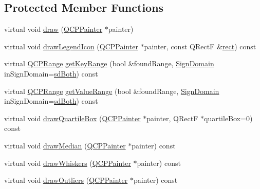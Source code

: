 \subsection*{Protected Member Functions}
\begin{DoxyCompactItemize}
\item 
virtual void \hyperlink{class_q_c_p_statistical_box_a753b62761217dd6b92f8a29e286a1317}{draw} (\hyperlink{class_q_c_p_painter}{Q\+C\+P\+Painter} $\ast$painter)
\item 
virtual void \hyperlink{class_q_c_p_statistical_box_a51764ed423fa02d3ef63f6848851ec33}{draw\+Legend\+Icon} (\hyperlink{class_q_c_p_painter}{Q\+C\+P\+Painter} $\ast$painter, const Q\+Rect\+F \&\hyperlink{_gen_blob_8m_aea8f6815d9a63491fc422c5572c6b3c3}{rect}) const 
\item 
virtual \hyperlink{class_q_c_p_range}{Q\+C\+P\+Range} \hyperlink{class_q_c_p_statistical_box_ad700fdce0f456dd22a3679d61e9896a4}{get\+Key\+Range} (bool \&found\+Range, \hyperlink{class_q_c_p_abstract_plottable_a661743478a1d3c09d28ec2711d7653d8}{Sign\+Domain} in\+Sign\+Domain=\hyperlink{class_q_c_p_abstract_plottable_a661743478a1d3c09d28ec2711d7653d8a082b98cfb91a7363a3b5cd17b0c1cd60}{sd\+Both}) const 
\item 
virtual \hyperlink{class_q_c_p_range}{Q\+C\+P\+Range} \hyperlink{class_q_c_p_statistical_box_adeef8c9a0361683c776bca2fbff292b7}{get\+Value\+Range} (bool \&found\+Range, \hyperlink{class_q_c_p_abstract_plottable_a661743478a1d3c09d28ec2711d7653d8}{Sign\+Domain} in\+Sign\+Domain=\hyperlink{class_q_c_p_abstract_plottable_a661743478a1d3c09d28ec2711d7653d8a082b98cfb91a7363a3b5cd17b0c1cd60}{sd\+Both}) const 
\item 
virtual void \hyperlink{class_q_c_p_statistical_box_a9ad0abdb154fefb04e9872f0db8e2ec7}{draw\+Quartile\+Box} (\hyperlink{class_q_c_p_painter}{Q\+C\+P\+Painter} $\ast$painter, Q\+Rect\+F $\ast$quartile\+Box=0) const 
\item 
virtual void \hyperlink{class_q_c_p_statistical_box_a16fef8bc19e5a09d82033edcfe919495}{draw\+Median} (\hyperlink{class_q_c_p_painter}{Q\+C\+P\+Painter} $\ast$painter) const 
\item 
virtual void \hyperlink{class_q_c_p_statistical_box_a6f8d093ec7e404529388d02da4c72b34}{draw\+Whiskers} (\hyperlink{class_q_c_p_painter}{Q\+C\+P\+Painter} $\ast$painter) const 
\item 
virtual void \hyperlink{class_q_c_p_statistical_box_a60ebb332a497f51ace837767db5105b9}{draw\+Outliers} (\hyperlink{class_q_c_p_painter}{Q\+C\+P\+Painter} $\ast$painter) const 
\end{DoxyCompactItemize}
